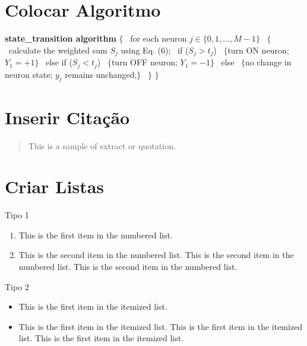 

\section{Colocar Algoritmo}

\begin{algorithm}
{\bf state\_transition algorithm} $\{$
\        for each neuron $j\in\{0,1,\ldots,M-1\}$
\        $\{$
\            calculate the weighted sum $S_j$ using Eq. (6);
\            if ($S_j>t_j$)
\                    $\{$turn ON neuron; $Y_1=+1\}$
\            else if ($S_j<t_j$)
\                    $\{$turn OFF neuron; $Y_1=-1\}$
\            else
\                    $\{$no change in neuron state; $y_j$ remains %
unchanged;$\}$
\        $\}$
$\}$
\end{algorithm}

\section{Inserir Citação}

\begin{quote}
	This is a sample of extract or quotation.
\end{quote}


\section{Criar Listas}

Tipo 1 \newline\newline

\begin{enumerate}
\item
This is the first item in the numbered list.

\item
This is the second item in the numbered list.
This is the second item in the numbered list.
This is the second item in the numbered list.
\end{enumerate}

Tipo 2 \newline\newline

\begin{itemize}
\item
This is the first item in the itemized list.

\item
This is the first item in the itemized list.
This is the first item in the itemized list.
This is the first item in the itemized list.
\end{itemize}

